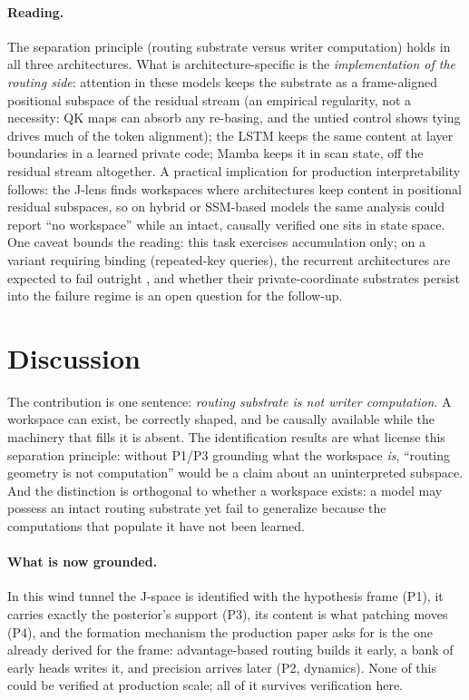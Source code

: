\documentclass[11pt]{article}
\newcommand{\Jspace}{J\mbox{-}space}
\begin{document}
\paragraph{Reading.} The separation principle (routing substrate
versus writer computation) holds in all three architectures. What is
architecture-specific is the \emph{implementation of the routing side}:
attention in these models keeps the substrate as a frame-aligned
positional subspace of the residual stream (an empirical regularity,
not a necessity: QK maps can absorb any re-basing, and the untied
control shows tying drives much of the token alignment); the LSTM keeps
the same content at layer boundaries in a learned private code; Mamba
keeps it in scan state, off the residual stream altogether. A practical implication for production
interpretability follows: the J-lens finds workspaces where
architectures keep content in positional residual subspaces, so on
hybrid or SSM-based models the same analysis could report ``no
workspace'' while an intact, causally verified one sits in state
space. One caveat bounds the reading: this task exercises accumulation
only; on a variant requiring binding (repeated-key queries), the
recurrent architectures are expected to fail outright
\citep{agarwal2026windtunnel}, and whether their private-coordinate
substrates persist into the failure regime is an open question for the
follow-up.

\section{Discussion}

The contribution is one sentence: \emph{routing substrate is not
writer computation}. A workspace can exist, be correctly shaped, and be
causally available while the machinery that fills it is absent. The
identification results are what license this separation principle:
without P1/P3 grounding what the workspace \emph{is}, ``routing
geometry is not computation'' would be a claim about an uninterpreted
subspace. And the distinction is orthogonal to whether a workspace
exists: a model may possess an intact routing substrate yet fail to
generalize because the computations that populate it have not been
learned.

\paragraph{What is now grounded.} In this wind tunnel the \Jspace{}
is identified with the hypothesis frame (P1), it carries exactly the
posterior's support (P3), its content is what patching moves (P4), and
the formation mechanism the production paper asks for is the one already
derived for the frame: advantage-based routing builds it early, a bank
of early heads writes it, and precision arrives later (P2, dynamics).
None of this could be verified at production scale; all of it survives
verification here.
\end{document}
